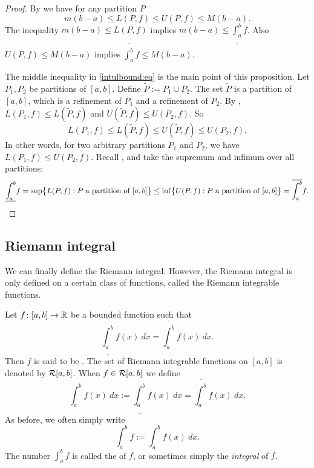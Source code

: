 \begin{proof}
By  we have for any partition $P$
\begin{equation*}
m(b-a) \leq L(P,f) \leq U(P,f) \leq M(b-a).
\end{equation*}
The inequality
$m(b-a) \leq L(P,f)$ implies $m(b-a) \leq \underline{\int_a^b} f$.
Also
$U(P,f) \leq M(b-a)$ implies $\overline{\int_a^b} f \leq M(b-a)$.

The middle inequality in
\eqref{intulbound:eq} is the main point of this proposition.
Let $P_1, P_2$ be partitions of $[a,b]$.  Define 
$\widetilde{P} := P_1 \cup P_2$.
The set $\widetilde{P}$ is a partition of $[a,b]$, which
is a refinement of $P_1$ and a refinement of $P_2$.
By ,
$L(P_1,f) \leq L(\widetilde{P},f)$ and
$U(\widetilde{P},f) \leq U(P_2,f)$.  So
\begin{equation*}
L(P_1,f) \leq L(\widetilde{P},f) \leq U(\widetilde{P},f) \leq U(P_2,f) .
\end{equation*}
In other words, for two arbitrary partitions $P_1$ and $P_2$, we have
$L(P_1,f) \leq U(P_2,f)$.  
Recall , and take the supremum and
infimum over all partitions:
\begin{equation*}
\underline{\int_a^b} f = 
\sup \bigl\{ L(P,f) : \text{$P$ a partition of $[a,b]$} \bigr\}
\leq
\inf \bigl\{ U(P,f) : \text{$P$ a partition of $[a,b]$} \bigr\}
=
\overline{\int_a^b} f . \qedhere
\end{equation*}
\end{proof}

\subsection{Riemann integral}

We can finally define the Riemann integral.  However, the Riemann
integral is only defined on a certain class of functions, called the
Riemann integrable functions.

\begin{defn}
Let $f \colon [a,b] \to {\mathbb{R}}$ be a bounded function such that
\begin{equation*}
\underline{\int_a^b} f(x)~dx = \overline{\int_a^b} f(x)~dx .
\end{equation*}
Then $f$ is said to be \emph{}.
The set of Riemann integrable functions on $[a,b]$ is denoted
by ${\mathcal{R}}[a,b]$.  When $f \in {\mathcal{R}}[a,b]$ we define
\begin{equation*}
\int_a^b f(x)~dx := 
\underline{\int_a^b} f(x)~dx = \overline{\int_a^b} f(x)~dx .
\end{equation*}
As before, we often simply write
\begin{equation*}
\int_a^b f := \int_a^b f(x)~dx.
\end{equation*}
The number $\int_a^b f$ is called the \emph{}
of $f$, or sometimes simply the \emph{integral} of $f$.
\end{defn}

